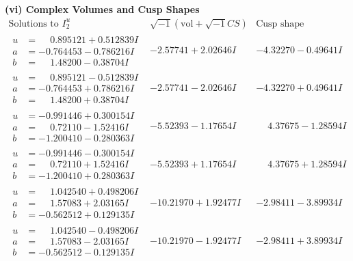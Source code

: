 \documentclass[1p]{elsarticle_modified}
\theoremstyle{definition}
\newcommand{\I}{\sqrt{-1}}
\begin{document}
\newpage\flushleft \textbf{(vi) Complex Volumes and Cusp Shapes}
$$\begin{array}{c|c|c}  
\text{Solutions to }I^u_{2}& \I (\text{vol} + \sqrt{-1}CS) & \text{Cusp shape}\\
 \hline 
\begin{aligned}
u &= \phantom{-}0.895121 + 0.512839 I \\
a &= -0.764453 - 0.786216 I \\
b &= \phantom{-}1.48200 - 0.38704 I\end{aligned}
 & -2.57741 + 2.02646 I & -4.32270 - 0.49641 I \\ \hline\begin{aligned}
u &= \phantom{-}0.895121 - 0.512839 I \\
a &= -0.764453 + 0.786216 I \\
b &= \phantom{-}1.48200 + 0.38704 I\end{aligned}
 & -2.57741 - 2.02646 I & -4.32270 + 0.49641 I \\ \hline\begin{aligned}
u &= -0.991446 + 0.300154 I \\
a &= \phantom{-}0.72110 - 1.52416 I \\
b &= -1.200410 - 0.280363 I\end{aligned}
 & -5.52393 - 1.17654 I & \phantom{-}4.37675 - 1.28594 I \\ \hline\begin{aligned}
u &= -0.991446 - 0.300154 I \\
a &= \phantom{-}0.72110 + 1.52416 I \\
b &= -1.200410 + 0.280363 I\end{aligned}
 & -5.52393 + 1.17654 I & \phantom{-}4.37675 + 1.28594 I \\ \hline\begin{aligned}
u &= \phantom{-}1.042540 + 0.498206 I \\
a &= \phantom{-}1.57083 + 2.03165 I \\
b &= -0.562512 + 0.129135 I\end{aligned}
 & -10.21970 + 1.92477 I & -2.98411 - 3.89934 I \\ \hline\begin{aligned}
u &= \phantom{-}1.042540 - 0.498206 I \\
a &= \phantom{-}1.57083 - 2.03165 I \\
b &= -0.562512 - 0.129135 I\end{aligned}
 & -10.21970 - 1.92477 I & -2.98411 + 3.89934 I \\ \hline\begin{aligned}

\end{aligned}
\end{array}$$
\end{document}

